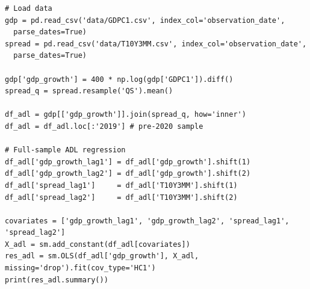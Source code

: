 
\begin{frame}[fragile]
\codesize
\begin{verbatim}
# Load data
gdp = pd.read_csv('data/GDPC1.csv', index_col='observation_date',
  parse_dates=True)
spread = pd.read_csv('data/T10Y3MM.csv', index_col='observation_date',
  parse_dates=True)

gdp['gdp_growth'] = 400 * np.log(gdp['GDPC1']).diff()
spread_q = spread.resample('QS').mean()

df_adl = gdp[['gdp_growth']].join(spread_q, how='inner')
df_adl = df_adl.loc[:'2019'] # pre-2020 sample

# Full-sample ADL regression
df_adl['gdp_growth_lag1'] = df_adl['gdp_growth'].shift(1)
df_adl['gdp_growth_lag2'] = df_adl['gdp_growth'].shift(2)
df_adl['spread_lag1']     = df_adl['T10Y3MM'].shift(1)
df_adl['spread_lag2']     = df_adl['T10Y3MM'].shift(2)

covariates = ['gdp_growth_lag1', 'gdp_growth_lag2', 'spread_lag1', 'spread_lag2']
X_adl = sm.add_constant(df_adl[covariates])
res_adl = sm.OLS(df_adl['gdp_growth'], X_adl, missing='drop').fit(cov_type='HC1')
print(res_adl.summary())
\end{verbatim}
\end{frame}

